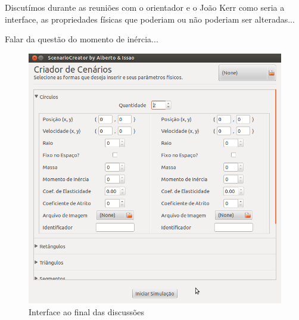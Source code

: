 Discutímos durante as reuniões com o orientador e o João Kerr como seria a interface, as propriedades físicas que poderiam ou não poderiam ser alteradas...

Falar da questão do momento de inércia...

\begin{figure}[H]
	\centering
	\includegraphics[scale=0.5]{images/physimulation.png}
	\caption{Interface ao final das discussões}
\end{figure}

